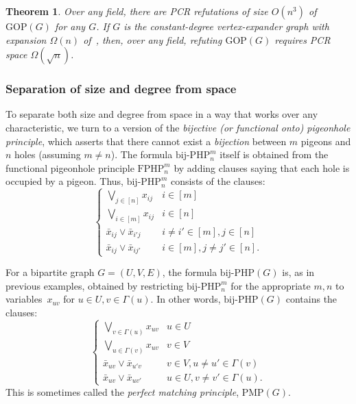 \documentclass[11pt]{article}
\numberwithin{equation}{section}
\newtheorem{theorem}{Theorem}[section]
\theoremstyle{definition}
\theoremstyle{plain}
\newcommand\GOP{\mathrm{GOP}}
\newcommand\FPHP{\mathrm{FPHP}}
\begin{document}
\begin{theorem}
Over any field, there are PCR refutations of size $O(n^{3})$ of $\GOP(G)$ for any $G$. If  $G$ is the constant-degree vertex-expander graph with 
expansion $\Omega(n)$ of~\cite{DBLP:journals/tocl/GalesiL10}, then, over any field, refuting $\GOP(G)$ requires PCR space $\Omega(\sqrt{n})$. 
\end{theorem}


\subsubsection{ Separation of size and degree from space}


To separate both size and degree from space in a way that works over any characteristic, we turn to a version
of the \emph{bijective  (or functional onto) pigeonhole principle}, which asserts that there cannot exist a \emph{bijection}
between $m$ pigeons and $n$ holes (assuming $m \neq n$). The formula $\mathrm{bij}$-$\mathrm{PHP}^{m}_n$
itself is obtained from the functional pigeonhole principle $\FPHP^m_n$ by adding clauses saying that
each hole is occupied by a pigeon. Thus, $\mathrm{bij}$-$\mathrm{PHP}^{m}_n$ consists of the clauses:
$$\left \{
\begin{array}{ll}
\bigvee_{j\in[n]}x_{ij}  & i \in [m]   \\
\bigvee_{i\in[m]}x_{ij}  & i \in [n] \\
\bar x_{ij} \vee \bar x_{i'j}  & i \not = i' \in [m],  j\in[n] \\
\bar x_{ij} \vee \bar x_{ij'}& i \in [m],  j \not = j'\in[n].
\end{array}
\right.
$$

For a bipartite graph $G=(U,V,E)$, the formula $\mathrm{bij}$-$\mathrm{PHP}(G)$ 
is, as in previous examples, obtained by restricting $\mathrm{bij}$-$\mathrm{PHP}^{m}_{n}$ 
for the appropriate $m,n$ to variables~$x_{uv}$ for $u\in U, v \in \Gamma(u)$.
In other words, $\mathrm{bij}$-$\mathrm{PHP}(G)$ contains the clauses: 
\[
\left \{
\begin{array}{ll}
\bigvee_{v\in\Gamma(u)}x_{uv}  & u \in U   \\
\bigvee_{u\in\Gamma(v)}x_{uv}  & v \in V   \\
\bar x_{uv} \vee \bar x_{u'v}  & v\in V,u \not = u' \in \Gamma(v) \\
\bar x_{uv} \vee \bar x_{uv'}&  u \in U,  v \not = v'\in \Gamma(u).
\end{array}
\right.
\]
This is sometimes called the \emph{perfect matching principle},
$\mathrm{PMP}(G)$.
\end{document}
